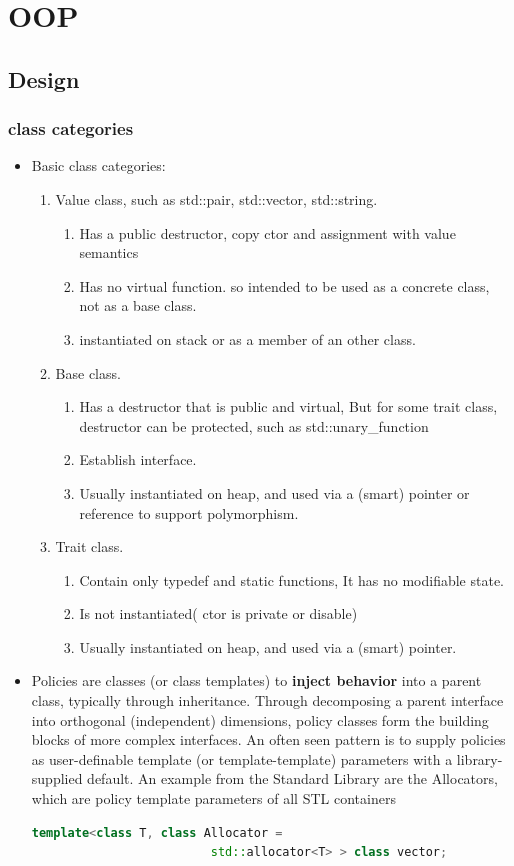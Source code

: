 \documentclass[a4paper,12pt,twoside]{book}
\begin{document}
\section{OOP}
\subsection{Design}
\subsubsection{class categories}
\begin{itemize}
\item Basic class categories:
\begin{enumerate}
\item Value class, such as std::pair, std::vector, std::string.
\begin{enumerate}
\item Has a public destructor, copy ctor and assignment with value semantics
\item Has no virtual function. so intended to be used as a concrete class, not as a base class.
\item instantiated on stack or as a member of an other class.
\end{enumerate}
\item Base class.
\begin{enumerate}
\item Has a destructor that is public and virtual, But for some trait class, destructor can be protected, such as std::unary\_function
\item Establish interface.
\item Usually instantiated on heap, and used via a (smart) pointer or reference to support polymorphism.
\end{enumerate}

\item Trait class.
\begin{enumerate}
\item Contain only typedef and static functions, It has no modifiable state.
\item Is not instantiated( ctor is private or disable)
\item Usually instantiated on heap, and used via a (smart) pointer.
\end{enumerate}
\end{enumerate}

\item Policies are classes (or class templates) to \textbf{inject behavior} into a parent class, typically through inheritance. Through decomposing a parent interface into orthogonal (independent) dimensions, policy classes form the building blocks of more complex interfaces. An often seen pattern is to supply policies as user-definable template (or template-template) parameters with a library-supplied default. An example from the Standard Library are the Allocators, which are policy template parameters of all STL containers
\begin{lstlisting}[frame=single, language=c++]
template<class T, class Allocator =
                         std::allocator<T> > class vector;
\end{lstlisting}


\end{itemize}
\end{document}
